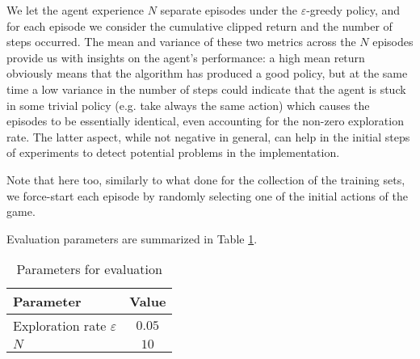 We let the agent experience $N$ separate episodes under the $\varepsilon$-greedy 
policy, and for each episode we consider the cumulative clipped return and the
number of steps occurred. The mean and variance of these two metrics across the 
$N$ episodes provide us with insights on the agent's performance: a high mean 
return obviously means that the algorithm has produced a good policy, but at the
same time a low variance in the number of steps could indicate that the agent is 
stuck in some trivial policy (e.g. take always the same action) which causes the
episodes to be essentially identical, even accounting for the non-zero 
exploration rate. The latter aspect, while not negative in general, can help in 
the initial steps of experiments to detect potential problems in the 
implementation.

Note that here too, similarly to what done for the collection of the training 
sets, we force-start each episode by randomly selecting one of the initial 
actions of the game. 

Evaluation parameters are summarized in Table \ref{t:eval}.

%
\begin{table}[h]
    \centering
    \begin{tabular}{l c} 
	\hline
	Parameter & Value \\ 
	\hline 
	Exploration rate $\varepsilon$ & $0.05$ \\
	$N$ &  $10$ \\
	\hline
    \end{tabular}
    \caption{Parameters for evaluation}
    \label{t:eval}
\end{table}
%

